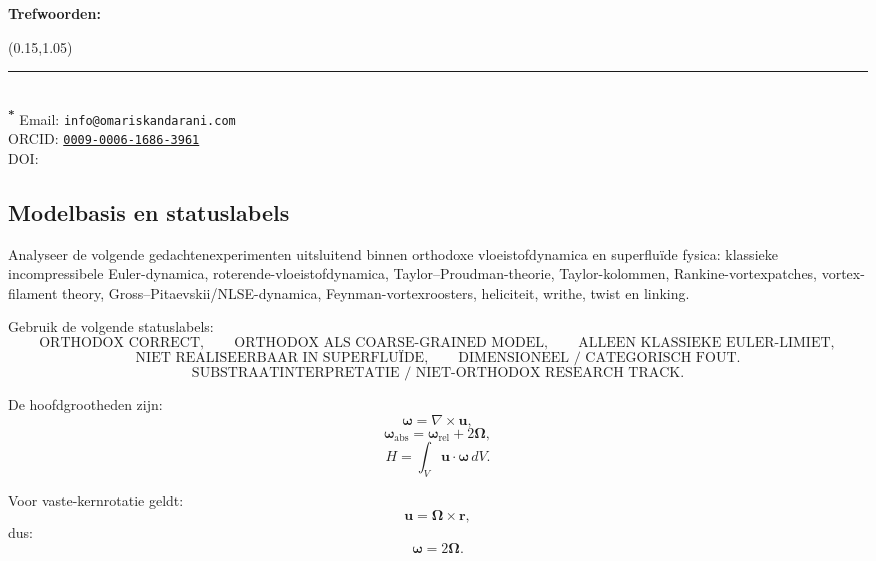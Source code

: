 \documentclass[11pt]{article}
\begin{document}
    \noindent\textbf{Trefwoorden:}  \paperkeywords


    \begin{textblock*}{1\textwidth}(0.15\textwidth,1.05\textheight)\raggedright\footnotesize\renewcommand{\arraystretch}{1.0} \noindent\rule{\textwidth}{0.4pt}\\[0.5em]
        \textsuperscript{\textbf{*}} Email: \texttt{info@omariskandarani.com}\\  
        ORCID: \texttt{\href{https://orcid.org/0009-0006-1686-3961}{0009-0006-1686-3961}}\\
        DOI: \href{https://doi.org/\paperdoi}{\paperdoi}    
    \end{textblock*}
    
    
    
    \newpage
    \tableofcontents
    \newpage
    
    
    \subsection{Modelbasis en statuslabels}
        
        Analyseer de volgende gedachtenexperimenten uitsluitend binnen orthodoxe vloeistofdynamica en superfluïde fysica:
        klassieke incompressibele Euler-dynamica, roterende-vloeistofdynamica, Taylor--Proudman-theorie,
        Taylor-kolommen, Rankine-vortexpatches, vortex-filament theory, Gross--Pitaevskii/NLSE-dynamica,
        Feynman-vortexroosters, heliciteit, writhe, twist en linking.
        
        Gebruik de volgende statuslabels:
        \[
            \text{ORTHODOX CORRECT},
            \qquad
            \text{ORTHODOX ALS COARSE-GRAINED MODEL},
            \qquad
            \text{ALLEEN KLASSIEKE EULER-LIMIET},
        \]
        \[
            \text{NIET REALISEERBAAR IN SUPERFLUÏDE},
            \qquad
            \text{DIMENSIONEEL / CATEGORISCH FOUT}.
        \]
        \[
            \text{SUBSTRAATINTERPRETATIE / NIET-ORTHODOX RESEARCH TRACK}.
        \]
        
        De hoofdgrootheden zijn:
        \[
            \boldsymbol{\omega}=\nabla\times\mathbf{u},
        \]
        \[
            \boldsymbol{\omega}_{\mathrm{abs}}
            =
            \boldsymbol{\omega}_{\mathrm{rel}}
            +
            2\boldsymbol{\Omega},
        \]
        \[
            H=\int_V \mathbf{u}\cdot\boldsymbol{\omega}\,dV.
        \]
        
        Voor vaste-kernrotatie geldt:
        \[
            \mathbf{u}
            =
            \boldsymbol{\Omega}\times\mathbf{r},
        \]
        dus:
        \[
            \boldsymbol{\omega}
            =
            2\boldsymbol{\Omega}.
        \]
        
\end{document}
